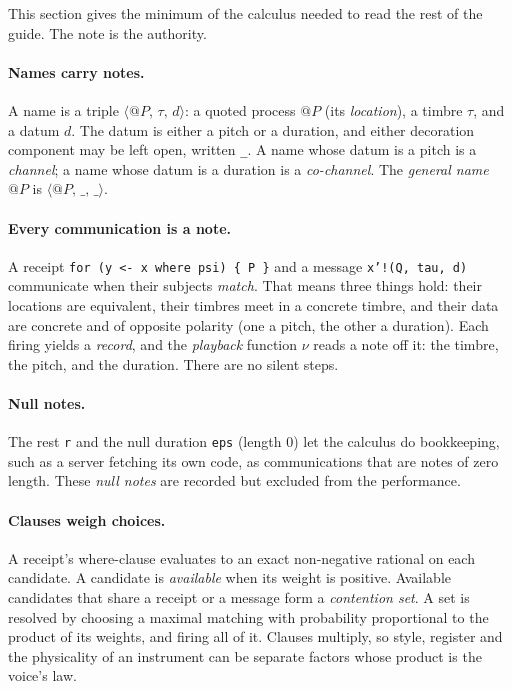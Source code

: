 \documentclass[11pt,a4paper]{article}
\makeatletter
\newcommand{\nm}[3]{\langle @#1,\,#2,\,#3\rangle}
\newcommand{\ttx}[1]{\texttt{#1}}
\makeatother
\begin{document}
This section gives the minimum of the calculus needed to read the rest of the
guide. The note is the authority.

\paragraph{Names carry notes.} A name is a triple $\nm{P}{\tau}{d}$: a quoted
process $@P$ (its \emph{location}), a timbre $\tau$, and a datum $d$. The datum
is either a pitch or a duration, and either decoration component may be left
open, written \ttx{\_}. A name whose datum is a pitch is a \emph{channel}; a
name whose datum is a duration is a \emph{co-channel}. The \emph{general name}
$@P$ is $\nm{P}{\_}{\_}$.

\paragraph{Every communication is a note.} A receipt
\ttx{for (y <- x where psi) \{ P \}} and a message \ttx{x'!(Q, tau, d)}
communicate when their subjects \emph{match}. That means three things hold:
their locations are equivalent, their timbres meet in a concrete timbre, and
their data are concrete and of opposite polarity (one a pitch, the other a
duration). Each firing yields a \emph{record}, and the \emph{playback} function
$\nu$ reads a note off it: the timbre, the pitch, and the duration. There are
no silent steps.

\paragraph{Null notes.} The rest \ttx{r} and the null duration \ttx{eps}
(length $0$) let the calculus do bookkeeping, such as a server fetching its
own code, as communications that are notes of zero length. These \emph{null
notes} are recorded but excluded from the performance.

\paragraph{Clauses weigh choices.} A receipt's where-clause evaluates to an
exact non-negative rational on each candidate. A candidate is \emph{available}
when its weight is positive. Available candidates that share a receipt or a
message form a \emph{contention set}. A set is resolved by choosing a maximal
matching with probability proportional to the product of its weights, and
firing all of it. Clauses multiply, so style, register and the physicality of
an instrument can be separate factors whose product is the voice's law.
\end{document}
